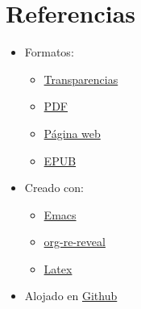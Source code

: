 \documentclass[a4paper]{article}
\begin{document}
\section{Referencias}
\label{sec:org0000036}
\begin{itemize}
\item Formatos:
\begin{itemize}
\item \href{./iaw-0-contenidos-criterios-evaluacion.reveal.html}{Transparencias}
\item \href{./iaw-0-contenidos-criterios-evaluacion.pdf}{PDF}
\item \href{./iaw-0-contenidos-criterios-evaluacion.wp.html}{Página web}
\item \href{./iaw-0-contenidos-criterios-evaluacion.epub}{EPUB}
\end{itemize}
\item Creado con:
\begin{itemize}
\item \href{https://www.gnu.org/s/emacs/}{Emacs}
\item \href{https://gitlab.com/oer/org-re-reveal}{org-re-reveal}
\item \href{https://www.latex-project.org/}{Latex}
\end{itemize}
\item Alojado en \href{https://alvarogonzalezsotillo.github.io/apuntes-clase}{Github}
\end{itemize}
\end{document}

